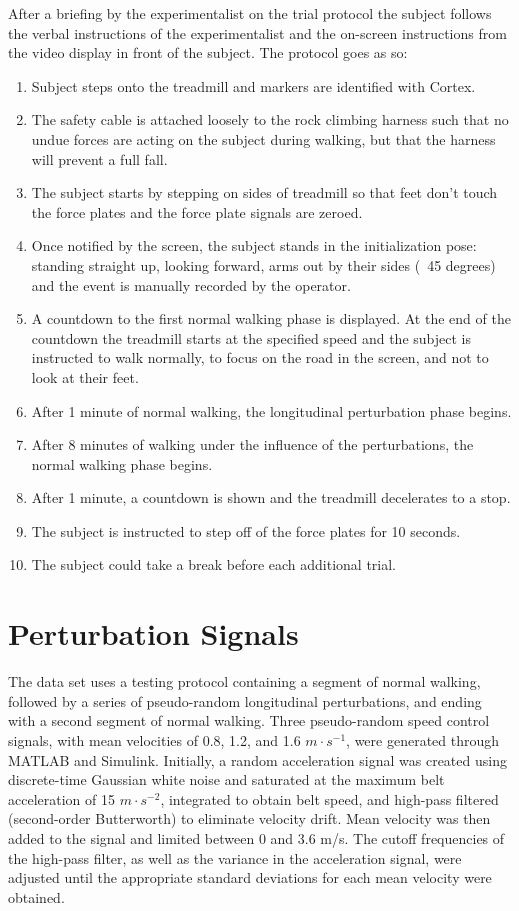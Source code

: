 \documentclass[10pt,a4paper,twocolumn]{article}
\begin{document}
After a briefing by the experimentalist on the trial protocol the subject
follows the verbal instructions of the experimentalist and the on-screen
instructions from the video display in front of the subject. The protocol goes
as so:
%
\begin{enumerate}
  \item Subject steps onto the treadmill and markers are identified with
    Cortex.
  \item The safety cable is attached loosely to the rock climbing harness such
    that no undue forces are acting on the subject during walking, but that the
    harness will prevent a full fall.
  \item The subject starts by stepping on sides of treadmill so that feet don't
    touch the force plates and the force plate signals are zeroed.
  \item Once notified by the screen, the subject stands in the initialization
    pose: standing straight up, looking forward, arms out by their sides (~45
    degrees) and the event is manually recorded by the operator.
  \item A countdown to the first normal walking phase is displayed. At the end
    of the countdown the treadmill starts at the specified speed and the
    subject is instructed to walk normally, to focus on the road in the
    screen, and not to look at their feet.
  \item After 1 minute of normal walking, the longitudinal perturbation phase
    begins.
  \item After 8 minutes of walking under the influence of the perturbations,
    the normal walking phase begins.
  \item After 1 minute, a countdown is shown and the treadmill decelerates to a
    stop.
  \item The subject is instructed to step off of the force plates for 10
    seconds.
  \item The subject could take a break before each additional trial.
\end{enumerate}

\section*{Perturbation Signals}
%
The data set uses a testing protocol containing a segment of normal walking,
followed by a series of pseudo-random longitudinal perturbations, and ending
with a second segment of normal walking. Three pseudo-random speed control
signals, with mean velocities of 0.8, 1.2, and 1.6 $m \cdot s^{-1}$, were
generated through MATLAB and Simulink. Initially, a  random acceleration signal
was created using discrete-time Gaussian white noise and saturated at the
maximum belt acceleration of 15 $m \cdot s^{-2}$, integrated to obtain belt
speed, and high-pass filtered (second-order Butterworth) to eliminate velocity
drift. Mean velocity was then added to the signal and limited between 0 and 3.6
m/s. The cutoff frequencies of the high-pass filter, as well as the variance in
the acceleration signal, were adjusted until the appropriate standard
deviations for each mean velocity were obtained.
\end{document}
